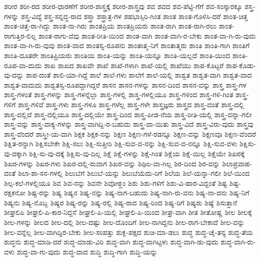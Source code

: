 {ಶರೀರ
ಶರೀ-ರದ
ಶರೀರ-ಧಾರಣೆಗೆ
ಶರೀರ-ಶಾಸ್ತ್ರಕ್ಕೆ
ಶರೀರ-ಶಾಸ್ತ್ರವು
ಶವ
ಶವದ
ಶವ-ಪೆಟ್ಟಿ-ಗೆಗೆ
ಶವ-ಸಂಸ್ಕಾರಕ್ಕೂ
ಶಸ್ತ್ರ-ಗಳನ್ನು
ಶಸ್ತ್ರ-ವಿದ್ಯೆ
ಶಸ್ತ್ರ-ಸನ್ನದ್ಧ-ರಾದ
ಶಸ್ತ್ರಾ
ಶಸ್ತ್ರಾತ್ರ-ಗಳ
ಶಹಭಾಸ್ಗಿರಿ-ಗಿಂತ
ಶಾಂತ
ಶಾಂತ-ಗೊಳಿಸಿ-ದರೆ
ಶಾಂತ-ಚಿತ್ತ
ಶಾಂತ-ಚಿತ್ತ-ರಾ-ಗಿದ್ದು
ಶಾಂತ-ನಾ-ಗಿರು
ಶಾಂತಪ್ರಿಯ
ಶಾಂತಪ್ರಿಯರು
ಶಾಂತ-ರಾಗಿ
ಶಾಂತ-ರಾಗಿ-ರಲು
ಶಾಂತ-ರಾಗುತ್ತಿರ-ಲಿಲ್ಲ
ಶಾಂತ-ರಾಗು-ವೆವು
ಶಾಂತ-ರೀತಿ-ಯಿಂದ
ಶಾಂತ-ವಾಗಿ
ಶಾಂತ-ವಾಗಿ-ರ-ಬೇಕು
ಶಾಂತ-ವಾ-ಗಿ-ರು-ವುದು
ಶಾಂತ-ವಾ-ಗಿ-ರು-ವುವು
ಶಾಂತ-ವಾದ
ಶಾಂತಸ್ವ-ರೂಪನು
ಶಾಂತಾತ್ಮ-ನಿಗೆ
ಶಾಂತಾತ್ಮರು
ಶಾಂತಿ
ಶಾಂತಿ-ಗಾಗಿ
ಶಾಂತಿಗೆ
ಶಾಂತಿ-ದೂತರೇ
ಶಾಂತಿಪ್ರಿಯರು
ಶಾಂತಿಯ
ಶಾಂತಿ-ಯನ್ನು
ಶಾಂತಿ-ಯನ್ನೂ
ಶಾಂತಿ-ಯಲ್ಲದೆ
ಶಾಂತಿ-ಯಿಂದ
ಶಾಂತಿ-ರೂಪ-ವಾ-ದುದು
ಶಾಖ
ಶಾಖದ
ಶಾಖವೇ
ಶಾಖೆ
ಶಾಖೆ-ಗಳಾಗಿ
ಶಾಖೆ-ಯಲ್ಲಿ
ಶಾಖೆಯು
ಶಾಪ-ಕೊಟ್ಟರೆ
ಶಾಪ-ಕೊಡು-ವು-ದನ್ನು
ಶಾಪ-ದಂತೆ
ಶಾಲಿ-ಯಾ-ಗಿದ್ದೆ
ಶಾಲೆ
ಶಾಲೆ-ಗಳು
ಶಾಲೆಗೆ
ಶಾಲೆ-ಯಲ್ಲಿ
ಶಾಶ್ವತ
ಶಾಶ್ವತ-ವಾಗಿ
ಶಾಶ್ವತ-ವಾದ
ಶಾಶ್ವತ-ವಾದುದು
ಶಾಶ್ವತಸ್ವ-ರೂಪದ್ದಾಗಿದ್ದರೆ
ಶಾಸನ
ಶಾಸನ-ಗಳನ್ನು
ಶಾಸನ-ದಿಂದ
ಶಾಸನ-ವನ್ನು
ಶಾಸ್ತ್ರ
ಶಾಸ್ತ್ರ-ಗಳ
ಶಾಸ್ತ್ರ-ಗಳಂತೆ
ಶಾಸ್ತ್ರ-ಗಳನ್ನು
ಶಾಸ್ತ್ರ-ಗಳನ್ನೆಲ್ಲಾ
ಶಾಸ್ತ್ರ-ಗಳಲ್ಲಿ
ಶಾಸ್ತ್ರ-ಗಳಲ್ಲಿಯೂ
ಶಾಸ್ತ್ರ-ಗಳಿಂದ
ಶಾಸ್ತ್ರ-ಗಳಿ-ಗಿಂತ
ಶಾಸ್ತ್ರ-ಗಳಿಗೆ
ಶಾಸ್ತ್ರ-ಗಳಿವೆ
ಶಾಸ್ತ್ರ-ಗಳು
ಶಾಸ್ತ್ರ-ಗಳೂ
ಶಾಸ್ತ್ರ-ಗಳೆಲ್ಲ
ಶಾಸ್ತ್ರ-ಗಳೇ
ಶಾಸ್ತ್ರಜ್ಞರು
ಶಾಸ್ತ್ರದ
ಶಾಸ್ತ್ರ-ದಂತೆ
ಶಾಸ್ತ್ರ-ದಲ್ಲಿ
ಶಾಸ್ತ್ರ-ದಲ್ಲಿದೆ
ಶಾಸ್ತ್ರ-ದಲ್ಲಿಯೂ
ಶಾಸ್ತ್ರ-ದಲ್ಲಿಯೇ
ಶಾಸ್ತ್ರ-ದಿಂದ
ಶಾಸ್ತ್ರ-ಪೀಡ-ನೆಯ
ಶಾಸ್ತ್ರ-ರೀತಿ-ಯಲ್ಲಿ
ಶಾಸ್ತ್ರ-ವನ್ನಾ-ಗಲೀ
ಶಾಸ್ತ್ರ-ವನ್ನು
ಶಾಸ್ತ್ರ-ವಾಕ್ಯ-ಗಳನ್ನು
ಶಾಸ್ತ್ರ-ವಾಗಿದ್ದಿ-ರ-ಬಹುದು
ಶಾಸ್ತ್ರ-ವಾ-ಯಿತು
ಶಾಸ್ತ್ರ-ವಿದೆ
ಶಾಸ್ತ್ರ-ವಿರು-ವುದು
ಶಾಸ್ತ್ರವು
ಶಾಸ್ತ್ರ-ವೆಂದರೆ
ಶಾಸ್ತ್ರೀ-ಯ-ವಾಗಿ
ಶಿಕ್ಷಕ
ಶಿಕ್ಷಕ-ನನ್ನು
ಶಿಕ್ಷಣ
ಶಿಕ್ಷಣ-ಗಳೆ-ರಡನ್ನೂ
ಶಿಕ್ಷಣ-ವನ್ನು
ಶಿಕ್ಷಣವೂ
ಶಿಕ್ಷಣ-ವೆಂದರೆ
ಶಿಕ್ಷಿತ-ರನ್ನಾಗಿ
ಶಿಕ್ಷಿಸಬೇಕೇ
ಶಿಕ್ಷಿ-ಸಲು
ಶಿಕ್ಷಿ-ಸುತ್ತೀರಿ
ಶಿಕ್ಷಿ-ಸುವ-ವ-ನನ್ನು
ಶಿಕ್ಷಿ-ಸುವ-ವ-ನನ್ನೂ
ಶಿಕ್ಷಿ-ಸುವ-ವಳು
ಶಿಕ್ಷಿಸು-ವು-ದಕ್ಕಾಗಿ
ಶಿಕ್ಷಿ-ಸು-ವು-ದಕ್ಕೆ
ಶಿಕ್ಷಿಸು-ವು-ದಿಲ್ಲ
ಶಿಕ್ಷೆ
ಶಿಕ್ಷೆ-ಗಳನ್ನು
ಶಿಕ್ಷೆ-ಗಿಂತ
ಶಿಕ್ಷೆಯ
ಶಿಕ್ಷೆ-ಯಿಲ್ಲ
ಶಿಕ್ಷೆಯೇ
ಶಿಖರಕ್ಕೆ
ಶಿಖರ-ಗಳನ್ನು
ಶಿಖರ-ಗಳು
ಶಿಖರ-ದಲ್ಲಿ-ರುವಾಗ
ಶಿಖರ-ವನ್ನು
ಶಿಥಿಲ-ವಾ-ಗಿಲ್ಲ
ಶಿರ-ದಿಂದ
ಶಿರ-ವನ್ನು
ಶಿಲಾಪ್ರವಾಹ-ದಂತೆ
ಶಿಲಾ-ಶಾ-ಸನ-ಗಳಲ್ಲಿ
ಶಿಲುಬೆಗೆ
ಶಿಲುಬೆ-ಯನ್ನು
ಶಿಲುಬೆಯೆದು-ರಿಗೆ
ಶಿಲೆಯ
ಶಿಲೆ-ಯನ್ನಾ-ಗಲೀ
ಶಿಲೆ-ಯಿಂದ
ಶಿಲ್ಪ-ಕಲೆ-ಗಳಲ್ಲಿಯೂ
ಶಿವ
ಶಿವ-ನನ್ನು
ಶಿವನೇ
ಶಿವೋಠ್ಹಂ
ಶಿಶು
ಶಿಶು-ಗಳಿಗೆ
ಶಿಶು-ವಿ-ಹಾರ-ವಿದ್ದಂತೆ
ಶಿಷ್ಟ
ಶಿಷ್ಟ-ರಕ್ಷಕನೋ
ಶಿಷ್ಟ-ರನ್ನು
ಶಿಷ್ಯ
ಶಿಷ್ಯನ
ಶಿಷ್ಯ-ನನ್ನು
ಶಿಷ್ಯ-ನಾಗ-ಬಹುದು
ಶಿಷ್ಯ-ನಾಗಿ-ರು-ವನು
ಶಿಷ್ಯ-ನಾ-ದನು
ಶಿಷ್ಯ-ನಿಗೆ
ಶಿಷ್ಯನು
ಶಿಷ್ಯ-ನೊಬ್ಬ
ಶಿಷ್ಯರ
ಶಿಷ್ಯ-ರನ್ನು
ಶಿಷ್ಯ-ರಲ್ಲಿ
ಶಿಷ್ಯ-ರಾದ
ಶಿಷ್ಯ-ರಿಂದ
ಶಿಷ್ಯ-ರಿಗೆ
ಶಿಷ್ಯರು
ಶಿಷ್ಯೆ
ಶಿಸುತ್ತಾನೆ
ಶೀಘ್ರಲಿಪಿ
ಶೀಘ್ರಲಿ-ಪಿ-ಕಾರ-ನಿದ್ದನೆ
ಶೀಘ್ರಲಿ-ಪಿ-ಯಲ್ಲಿ
ಶೀಘ್ರಲಿ-ಪಿ-ಯಿಂದ
ಶೀಘ್ರ-ವಾಗಿ
ಶೀತ
ಶೀತೋಷ್ಣ
ಶೀಲ
ಶೀಲಕ್ಕೆ
ಶೀಲ-ಗಳನ್ನು
ಶೀಲದ
ಶೀಲ-ದಲ್ಲಿ
ಶೀಲ-ದಷ್ಟು
ಶೀಲ-ದೊಂದಿಗೆ
ಶೀಲ-ನಾಗಿದ್ದನು
ಶೀಲ-ರಾಗ-ಬೇಕಾದೆ
ಶೀಲ-ವನ್ನು
ಶೀಲ-ವನ್ನೆಲ್ಲ
ಶೀಲ-ವಾಗಿದ್ದಿರ-ಬೇಕು
ಶೀಲ-ಸಂಪತ್ತು
ಶುಕ್ಲ-ಪಕ್ಷದ
ಶುಚಿ-ಮಾ-ಡಲು
ಶುದ್ಧ
ಶುದ್ಧ-ಚೈ-ತನ್ಯ
ಶುದ್ಧ-ತೆಯ
ಶುದ್ಧನು
ಶುದ್ಧ-ಮಾಡಿ-ದರೆ
ಶುದ್ಧ-ಮಾಡು-ವಿರಿ
ಶುದ್ಧ-ವಾಗಿ
ಶುದ್ಧ-ವಾಗಿಟ್ಟಳು
ಶುದ್ಧ-ವಾಗಿ-ಡು-ವುದು
ಶುದ್ಧ-ವಾಗಿ-ರು-ವಳು
ಶುದ್ಧ-ವಾ-ಗು-ವುದು
ಶುದ್ಧ-ವಾದ
ಶುದ್ಧಿ
ಶುದ್ಧಿ-ಗಾಗಿ
ಶುದ್ಧಿ-ಯನ್ನು
}
